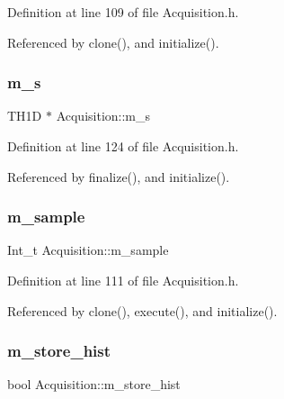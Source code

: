 Definition at line 109 of file Acquisition.\+h.



Referenced by clone(), and initialize().

\mbox{\label{classAcquisition_ad7f531c3d3fc58d1a2a5eab954db0ca7}} 
\subsubsection{\texorpdfstring{m\+\_\+s}{m\_s}}
{\footnotesize\ttfamily T\+H1D $\ast$ Acquisition\+::m\+\_\+s\hspace{0.3cm}{\ttfamily [private]}}



Definition at line 124 of file Acquisition.\+h.



Referenced by finalize(), and initialize().

\mbox{\label{classAcquisition_a154e5423720ab1f2c4ab5cd125cb4e80}} 
\subsubsection{\texorpdfstring{m\+\_\+sample}{m\_sample}}
{\footnotesize\ttfamily Int\+\_\+t Acquisition\+::m\+\_\+sample\hspace{0.3cm}{\ttfamily [private]}}



Definition at line 111 of file Acquisition.\+h.



Referenced by clone(), execute(), and initialize().

\mbox{\label{classAcquisition_a08f70edd83751dbdab4c8190dc4b9188}} 
\subsubsection{\texorpdfstring{m\+\_\+store\+\_\+hist}{m\_store\_hist}}
{\footnotesize\ttfamily bool Acquisition\+::m\+\_\+store\+\_\+hist\hspace{0.3cm}{\ttfamily [private]}}



